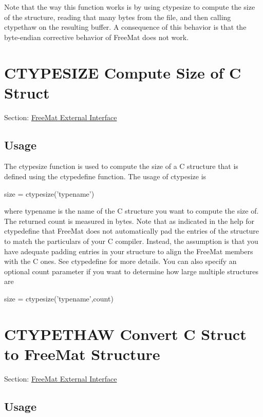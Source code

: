  Note that the way this function works is by using {\ttfamily ctypesize} to compute the size of the structure, reading that many bytes from the file, and then calling {\ttfamily ctypethaw} on the resulting buffer. A consequence of this behavior is that the byte-\/endian corrective behavior of Free\-Mat does not work. \hypertarget{external_ctypesize}{}\section{C\-T\-Y\-P\-E\-S\-I\-Z\-E Compute Size of C Struct}\label{external_ctypesize}
Section\-: \hyperlink{sec_external}{Free\-Mat External Interface} \hypertarget{vtkwidgets_vtkxyplotwidget_Usage}{}\subsection{Usage}\label{vtkwidgets_vtkxyplotwidget_Usage}
The {\ttfamily ctypesize} function is used to compute the size of a C structure that is defined using the {\ttfamily ctypedefine} function. The usage of {\ttfamily ctypesize} is \begin{DoxyVerb}   size = ctypesize('typename')
\end{DoxyVerb}
 where {\ttfamily typename} is the name of the C structure you want to compute the size of. The returned count is measured in bytes. Note that as indicated in the help for {\ttfamily ctypedefine} that Free\-Mat does not automatically pad the entries of the structure to match the particulars of your C compiler. Instead, the assumption is that you have adequate padding entries in your structure to align the Free\-Mat members with the C ones. See {\ttfamily ctypedefine} for more details. You can also specify an optional count parameter if you want to determine how large multiple structures are \begin{DoxyVerb}   size = ctypesize('typename',count)
\end{DoxyVerb}
 \hypertarget{external_ctypethaw}{}\section{C\-T\-Y\-P\-E\-T\-H\-A\-W Convert C Struct to Free\-Mat Structure}\label{external_ctypethaw}
Section\-: \hyperlink{sec_external}{Free\-Mat External Interface} \hypertarget{vtkwidgets_vtkxyplotwidget_Usage}{}\subsection{Usage}\label{vtkwidgets_vtkxyplotwidget_Usage}

